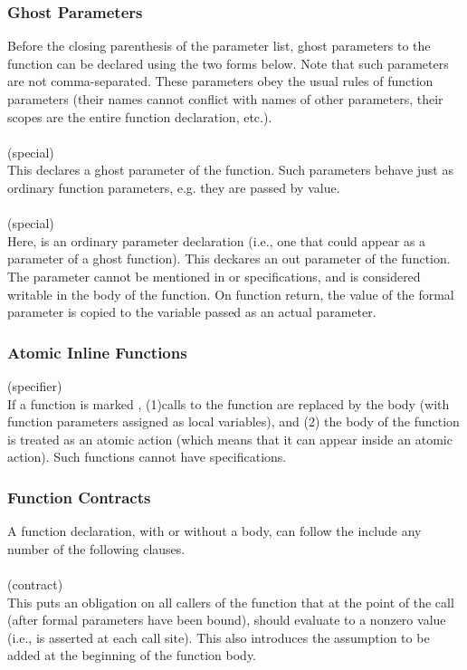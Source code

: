 \documentclass[preprint,nocopyrightspace]{sigplanconf}
\begin{document}
{{{{\begin{VCC}
\subsubsection{Ghost Parameters}

Before the closing parenthesis of the parameter list, ghost parameters
to the function can be declared using the two forms below. Note that
such parameters are not comma-separated.
These parameters obey the usual rules of function
parameters (their names cannot conflict with names of other
parameters, their scopes are the entire function declaration, etc.).
\\\\
 (special)\\
This declares a ghost parameter of the function. Such parameters
behave just as ordinary function parameters, e.g. they are passed by value.
\\\\
 (special)\\
Here,  is an ordinary parameter declaration (i.e., one that
could appear as a parameter of a ghost function). This 
deckares an out parameter of the function. The parameter
cannot be mentioned in  or 
specifications, and is considered writable in the body of the
function. On function return, the value of the formal parameter is
copied to the variable passed as an actual parameter.

\subsubsection{Atomic Inline Functions}

 (specifier)\\
If a function is marked , (1)calls to the
function are replaced by the body (with function parameters assigned
as local variables), and (2) the body of the function is treated as an
atomic action (which means that it can appear inside an atomic
action). Such functions cannot have specifications.

\subsubsection{Function Contracts}
A function declaration, with or without a body, can follow the
include any number of the following clauses. 
\\\\
 (contract)\\
This puts  an obligation on  all callers of  the function that  at the
point of the  call (after formal parameters have  been bound), 
should evaluate to a nonzero  value (i.e.,  is asserted at each
call site). This also introduces  the assumption to be added at
the beginning of the function body. 


\end{VCC}}}}}
\end{document}
